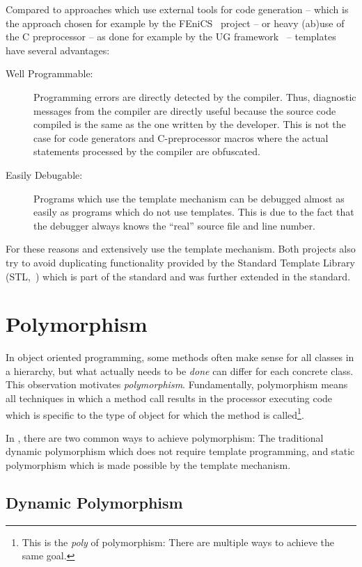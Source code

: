 Compared to approaches which use external tools for code generation --
which is the approach chosen for example by the
FEniCS~\cite{FENICS-HP} project -- or heavy (ab)use of the C
preprocessor -- as done for example by the UG framework~\cite{UG-HP}
-- templates have several advantages:
\begin{description}
\item[Well Programmable:] Programming errors are directly detected by
  the \Cplusplus compiler. Thus, diagnostic messages from the compiler are
  directly useful because the source code compiled is the
  same as the one written by the developer. This is not the case
  for code generators and C-preprocessor macros where the actual
  statements processed by the compiler are obfuscated.
\item[Easily Debugable:] Programs which use the template mechanism can be
  debugged almost as easily as \Cplusplus programs which do not use
  templates. This is due to the fact that the debugger always knows
  the ``real'' source file and line number.
\end{description}
For these reasons \Dune and \eWoms extensively use the template
mechanism. Both projects also try to avoid duplicating functionality
provided by the Standard Template Library (STL,~\cite{STL-REF-HP})
which is part of the  standard and was further extended
in the  standard.

\section{Polymorphism}

In object oriented programming, some methods often make sense for all
classes in a hierarchy, but what actually needs to be \emph{done}
can differ for each concrete class. This observation motivates
\emph{polymorphism}. Fundamentally, polymorphism means all
techniques in which a method call results in the processor executing code
which is specific to the type of object for which the method is
called\footnote{This is the \emph{poly} of polymorphism: There are
  multiple ways to achieve the same goal.}.

In \Cplusplus, there are two common ways to achieve polymorphism: The
traditional dynamic polymorphism which does not require template
programming, and static polymorphism which is made possible by the
template mechanism.

\subsection*{Dynamic Polymorphism}

